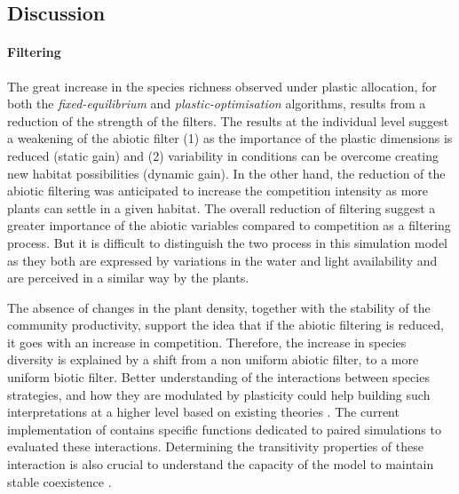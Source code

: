 
\subsection{Discussion}



\paragraph{Filtering} 
The great increase in the species richness observed under plastic allocation, for both the \textit{fixed-equilibrium} and \textit{plastic-optimisation} algorithms,  
results from a reduction of the strength of the filters. The results at the individual level suggest a weakening of the abiotic filter (1) as the importance of the plastic dimensions is reduced (static gain) and (2) variability in conditions can be overcome creating new habitat possibilities (dynamic gain). In the other hand, the reduction of the abiotic filtering was anticipated to increase the competition intensity as more plants can settle in a given habitat.
The overall reduction of filtering suggest a greater importance of the abiotic variables compared to competition as a filtering process. But it is difficult to distinguish the two process in this simulation model as they both are expressed by variations in the water and light availability and are perceived in a similar way by the plants. 


The absence of changes in the plant density, together with the stability of the community productivity, support the idea that if the abiotic filtering is reduced, it goes with an increase in competition. Therefore, the increase in species diversity is explained by a shift from a non uniform abiotic filter, to a more uniform biotic filter. Better understanding of the interactions between species strategies, and how they are modulated by plasticity could help building such interpretations at a higher level based on existing theories \parencite{chesson_mechanisms_2000}. The current implementation of \model contains specific functions dedicated to paired simulations to evaluated these interactions. Determining the transitivity properties of these interaction is also crucial to understand the capacity of the model to maintain stable coexistence \parencite{levine_beyond_2017}.


